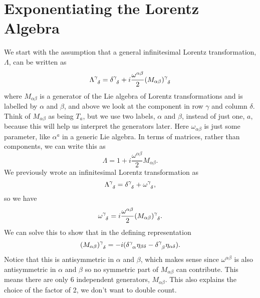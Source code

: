 \documentclass[fleqn]{NotesClass}
\newcommand{\ident}{1}
\newcommand{\minkowskiMetric}{\eta}
\begin{document}
    \section{Exponentiating the Lorentz Algebra}
    We start with the assumption that a general infinitesimal Lorentz transformation, \(\Lambda\), can be written as
    \begin{equation}
        \tensor{\Lambda}{^\gamma_\delta} = \tensor{\delta}{^\gamma_\delta} + i\frac{\omega^{\alpha\beta}}{2}\tensor{(M_{\alpha\beta})}{^\gamma_\delta}
    \end{equation}
    where \(M_{\alpha\beta}\) is a generator of the Lie algebra of Lorentz transformations and is labelled by \(\alpha\) and \(\beta\), and above we look at the component in row \(\gamma\) and column \(\delta\).
    Think of \(M_{\alpha\beta}\) as being \(T_a\), but we use two labels, \(\alpha\) and \(\beta\), instead of just one, \(a\), because this will help us interpret the generators later.
    Here \(\omega_{\alpha\beta}\) is just some parameter, like \(\alpha^a\) in a generic Lie algebra.
    In terms of matrices, rather than components, we can write this as
    \begin{equation}
        \Lambda = \ident + i\frac{\omega^{\alpha\beta}}{2}M_{\alpha\beta}.
    \end{equation}
    We previously wrote an infinitesimal Lorentz transformation as
    \begin{equation}
        \tensor{\Lambda}{^\gamma_\delta} = \tensor{\delta}{^\gamma_\delta} + \tensor{\omega}{^\gamma_\delta},
    \end{equation}
    so we have
    \begin{equation}
        \tensor{\omega}{^\gamma_\delta} = i\frac{\omega^{\alpha\beta}}{2}\tensor{(M_{\alpha\beta})}{^\gamma_\delta}.
    \end{equation}
    We can solve this to show that in the defining representation
    \begin{equation}
        \tensor{(M_{\alpha\beta})}{^\gamma_\delta} = -i(\tensor{\delta}{^\gamma_\alpha}\minkowskiMetric_{\beta\delta} - \tensor{\delta}{^\gamma_\beta}\minkowskiMetric_{\alpha\delta}).
    \end{equation}
    Notice that this is antisymmetric in \(\alpha\) and \(\beta\), which makes sense since \(\omega^{\alpha\beta}\) is also antisymmetric in \(\alpha\) and \(\beta\) so no symmetric part of \(M_{\alpha\beta}\) can contribute.
    This means there are only \(6\) independent generators, \(M_{\alpha\beta}\).
    This also explains the choice of the factor of 2, we don't want to double count.
    
\end{document}
